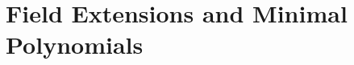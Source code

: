 \documentclass[../modern_algebra_2.tex]{subfiles}
\begin{document}
\section{Field Extensions and Minimal Polynomials}
\end{document}
